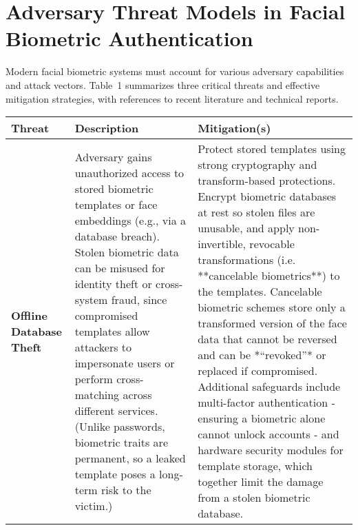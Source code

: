 \section{Adversary Threat Models in Facial Biometric Authentication}
Modern facial biometric systems must account for various adversary capabilities and attack vectors. Table 1 summarizes three critical threats and effective mitigation strategies, with references to recent literature and technical reports.

\begin{table}[htbp]
  \centering
  \small
  \begin{tabular}{|p{3.2cm}|p{6.2cm}|p{5.8cm}|}
    \hline
    \textbf{Threat} & \textbf{Description} & \textbf{Mitigation(s)} \\
    \hline
    \textbf{Offline Database Theft} & Adversary gains unauthorized access to stored biometric templates or face embeddings (e.g., via a database breach). Stolen biometric data can be misused for identity theft or cross-system fraud, since compromised templates allow attackers to impersonate users or perform cross-matching across different services. (Unlike passwords, biometric traits are permanent, so a leaked template poses a long-term risk to the victim.) & Protect stored templates using strong cryptography and transform-based protections. Encrypt biometric databases at rest so stolen files are unusable, and apply non-invertible, revocable transformations (i.e. **cancelable biometrics**) to the templates. Cancelable biometric schemes store only a transformed version of the face data that cannot be reversed and can be *“revoked”* or replaced if compromised. Additional safeguards include multi-factor authentication - ensuring a biometric alone cannot unlock accounts - and hardware security modules for template storage, which together limit the damage from a stolen biometric database. \\
    \hline

\end{tabular}
\end{table}
